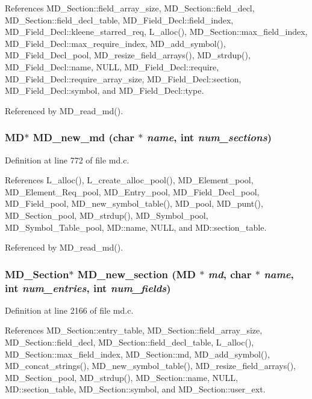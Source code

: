 References MD\_\-Section::field\_\-array\_\-size, MD\_\-Section::field\_\-decl, MD\_\-Section::field\_\-decl\_\-table, MD\_\-Field\_\-Decl::field\_\-index, MD\_\-Field\_\-Decl::kleene\_\-starred\_\-req, L\_\-alloc(), MD\_\-Section::max\_\-field\_\-index, MD\_\-Field\_\-Decl::max\_\-require\_\-index, MD\_\-add\_\-symbol(), MD\_\-Field\_\-Decl\_\-pool, MD\_\-resize\_\-field\_\-arrays(), MD\_\-strdup(), MD\_\-Field\_\-Decl::name, NULL, MD\_\-Field\_\-Decl::require, MD\_\-Field\_\-Decl::require\_\-array\_\-size, MD\_\-Field\_\-Decl::section, MD\_\-Field\_\-Decl::symbol, and MD\_\-Field\_\-Decl::type.

Referenced by MD\_\-read\_\-md().
\subsubsection{\setlength{\rightskip}{0pt plus 5cm}\bf{MD}$\ast$ MD\_\-new\_\-md (char $\ast$ {\em name}, int {\em num\_\-sections})}\label{md_8c_2074850b98f8fb845094a223994c8e4d}




Definition at line 772 of file md.c.

References L\_\-alloc(), L\_\-create\_\-alloc\_\-pool(), MD\_\-Element\_\-pool, MD\_\-Element\_\-Req\_\-pool, MD\_\-Entry\_\-pool, MD\_\-Field\_\-Decl\_\-pool, MD\_\-Field\_\-pool, MD\_\-new\_\-symbol\_\-table(), MD\_\-pool, MD\_\-punt(), MD\_\-Section\_\-pool, MD\_\-strdup(), MD\_\-Symbol\_\-pool, MD\_\-Symbol\_\-Table\_\-pool, MD::name, NULL, and MD::section\_\-table.

Referenced by MD\_\-read\_\-md().
\subsubsection{\setlength{\rightskip}{0pt plus 5cm}\bf{MD\_\-Section}$\ast$ MD\_\-new\_\-section (\bf{MD} $\ast$ {\em md}, char $\ast$ {\em name}, int {\em num\_\-entries}, int {\em num\_\-fields})}\label{md_8c_21a0861671d703189c6506f9583453a0}




Definition at line 2166 of file md.c.

References MD\_\-Section::entry\_\-table, MD\_\-Section::field\_\-array\_\-size, MD\_\-Section::field\_\-decl, MD\_\-Section::field\_\-decl\_\-table, L\_\-alloc(), MD\_\-Section::max\_\-field\_\-index, MD\_\-Section::md, MD\_\-add\_\-symbol(), MD\_\-concat\_\-strings(), MD\_\-new\_\-symbol\_\-table(), MD\_\-resize\_\-field\_\-arrays(), MD\_\-Section\_\-pool, MD\_\-strdup(), MD\_\-Section::name, NULL, MD::section\_\-table, MD\_\-Section::symbol, and MD\_\-Section::user\_\-ext.

